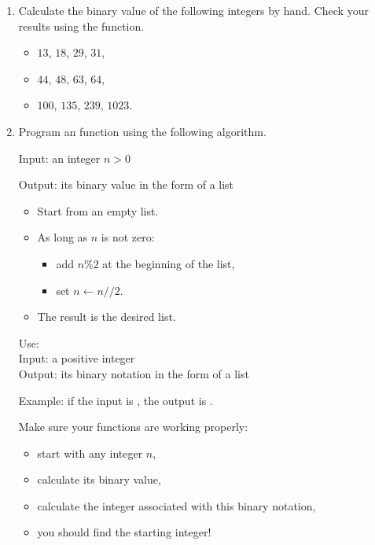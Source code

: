 \documentclass[11pt,class=report,crop=false]{standalone}
\begin{document}
\begin{activite}[]


\begin{enumerate}
  \item Calculate the binary value of the following integers by hand. Check your results using the \Python{}  function.
  
   \begin{itemize}
    \item $13$, $18$, $29$, $31$,
    \item $44$, $48$, $63$, $64$,
    \item $100$, $135$, $239$, $1023$.
  \end{itemize} 
  
  \item
  Program an  function using the following algorithm.

  \begin{algorithme}
  Input: an integer $n>0$

  Output: its binary value in the form of a list

  \begin{itemize}
    \item Start from an empty list.
    
    \item As long as $n$ is not zero:
    
     \begin{itemize} 
       \item add $n \% 2$ at the beginning of the list,
       \item set $n \leftarrow n//2$.
     \end{itemize}    
         
    \item The result is the desired list.
  \end{itemize} 
             
 \end{algorithme}
 
   \begin{fonction}
  Use:  \\
  Input: a positive integer \\
  Output: its binary notation in the form of a list
  
  \medskip  
  Example: if the input is , the output is \ci{[1,1,0,0,1,1,0,0]}.
  \end{fonction} 
  
  Make sure your functions are working properly:
  \begin{itemize}
    \item start with any integer $n$,
    \item calculate its binary value,
    \item calculate the integer associated with this binary notation,
    \item you should find the starting integer!
  \end{itemize}
\end{enumerate}
\end{activite}
\end{document}
